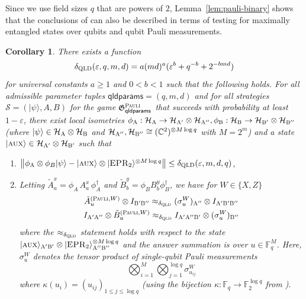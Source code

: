 \documentclass[11pt]{article}
\newtheorem{corollary}[theorem]{Corollary}
\theoremstyle{definition}
\newcommand{\ket}[1]{|#1\rangle}
\newcommand{\C}{\ensuremath{\mathbb{C}}}
\newcommand{\F}{\ensuremath{\mathbb{F}}}
\newcommand{\mH}{\ensuremath{\mathcal{H}}}
\newcommand{\eps}{\varepsilon}
\newcommand{\game}{\mathfrak{G}}
\newcommand{\strategy}{\mathscr{S}}
\newcommand{\gamestyle}[1]{\ensuremath{\textsc{#1}}\xspace}
\newcommand{\qld}{\gamestyle{QLD}}
\newcommand{\pauli}{\gamestyle{Pauli}}
\newcommand{\labelstyle}[1]{\ensuremath{\textsc{#1}}\xspace}
\newcommand{\EPR}{\labelstyle{EPR}}
\newcommand{\aux}{\labelstyle{aux}}
\newcommand{\alice}{\labelstyle{A}}
\newcommand{\bob}{\labelstyle{B}}
\newcommand{\qldparams}{\mathsf{qldparams}}
\begin{document}
Since we use field sizes $q$ that are powers of $2$, Lemma~\ref{lem:pauli-binary}
shows that the conclusions of  can also be described in terms of
testing for maximally entangled states over qubits and qubit Pauli measurements.







\begin{corollary}
\label{cor:pauli-binary}  
There exists a function
\[\delta_{\qld}(\eps,q,m,d) = a(md)^a(\eps^b + q^{-b} + 2^{-bmd})\]
for universal constants $a \geq 1$ and $0 < b < 1$ such that the following holds. For all admissible parameter tuples $\qldparams = (q,m,d)$ and for all strategies $\strategy = (\ket{\psi},A,B)$ for the game $\game^\pauli_\qldparams$ that succeeds with probability at least $1 - \eps$, there exist local isometries $\phi_\alice: \mH_\alice \to \mH_{\alice'} \otimes \mH_{\alice''},\phi_\bob: \mH_\bob \to \mH_{\bob'} \otimes \mH_{\bob''}$ (where $\ket{\psi} \in \mH_\alice \otimes \mH_\bob$ and $\mH_{\alice''},\mH_{\bob''} \cong (\C^2)^{\otimes M \log q}$ with $M = 2^m$) and a state $\ket{\aux} \in \mH_{\alice'} \otimes \mH_{\bob'}$ such that 
\begin{enumerate}
    \item $\left \| \phi_\alice \otimes \phi_B \ket{\psi} - \ket{\aux} \otimes \ket{\EPR_2}^{\otimes M \log q}  \right \| \leq \delta_{\qld}(\eps,m,d,q)$,
    \item Letting $\tilde{A}^x_a = \phi_A\, A^x_a \, \phi_A^\dagger$ and $\tilde{B}^y_b = \phi_B B^y_b \phi_B^\dagger$, we have for $W \in \{X,Z\}$
    \begin{gather*}
        \tilde{A}^{(\pauli,W)}_u \otimes I_{\bob'\bob''} \approx_{\delta_{\qld}} (\sigma^W_u)_{\alice''} \otimes I_{\alice' \bob' \bob''} \\
        I_{\alice'\alice''} \otimes \tilde{B}^{(\pauli,W)}_u    \approx_{\delta_{\qld}} I_{\alice' \alice'' \bob'} \otimes (\sigma^W_u)_{\bob''}
    \end{gather*}
    where the $\approx_{\delta_{\qld}}$ statement holds with respect to the state $\ket{\aux}_{\alice'\bob'} \otimes \ket{\EPR_2}^{\otimes M \log q}_{\alice''\bob''}$ and the answer summation is over $u \in \F_q^M$. Here, $\sigma^W_u$ denotes the tensor product of single-qubit Pauli measurements
    \[
    	\bigotimes_{i=1}^{M} \bigotimes_{j=1}^{\log q} \sigma^W_{u_{ij}}
    \]
    where $\kappa(u_i) = (u_{ij})_{1 \leq j \leq \log q}$ (using the bijection $\kappa: \F_q \to \F_2^{\log q}$ from ).
\end{enumerate}  
\end{corollary}
\end{document}
